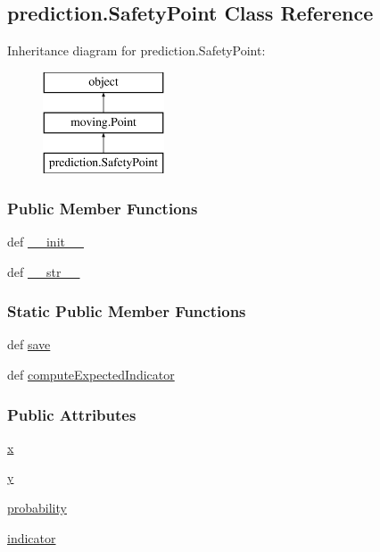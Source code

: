 \hypertarget{classprediction_1_1SafetyPoint}{\subsection{prediction.\-Safety\-Point Class Reference}
\label{classprediction_1_1SafetyPoint}
}
Inheritance diagram for prediction.\-Safety\-Point\-:\begin{figure}[H]
\begin{center}
\leavevmode
\includegraphics[height=3.000000cm]{classprediction_1_1SafetyPoint}
\end{center}
\end{figure}
\subsubsection*{Public Member Functions}
\begin{DoxyCompactItemize}
\item 
def \hyperlink{classprediction_1_1SafetyPoint_af30c48c38f3b3bd286095b808d33281b}{\-\_\-\-\_\-init\-\_\-\-\_\-}
\item 
def \hyperlink{classprediction_1_1SafetyPoint_afb1d0bc8a7dbf51b75e270dcf2098dc0}{\-\_\-\-\_\-str\-\_\-\-\_\-}
\end{DoxyCompactItemize}
\subsubsection*{Static Public Member Functions}
\begin{DoxyCompactItemize}
\item 
def \hyperlink{classprediction_1_1SafetyPoint_a023f258d9ca180fce39187ee432b4870}{save}
\item 
def \hyperlink{classprediction_1_1SafetyPoint_ac8bcdcc4fd2394bdf7133bea55277dc8}{compute\-Expected\-Indicator}
\end{DoxyCompactItemize}
\subsubsection*{Public Attributes}
\begin{DoxyCompactItemize}
\item 
\hyperlink{classprediction_1_1SafetyPoint_a9f202108705b2d9fd4109cbd7744f135}{x}
\item 
\hyperlink{classprediction_1_1SafetyPoint_a3145aaa84593c68833ca3c1552714e5c}{y}
\item 
\hyperlink{classprediction_1_1SafetyPoint_a8c892e8a7553d30e03ff0e69e6278a84}{probability}
\item 
\hyperlink{classprediction_1_1SafetyPoint_a21037e5e96b53e0e62ce35ee78736588}{indicator}
\end{DoxyCompactItemize}


